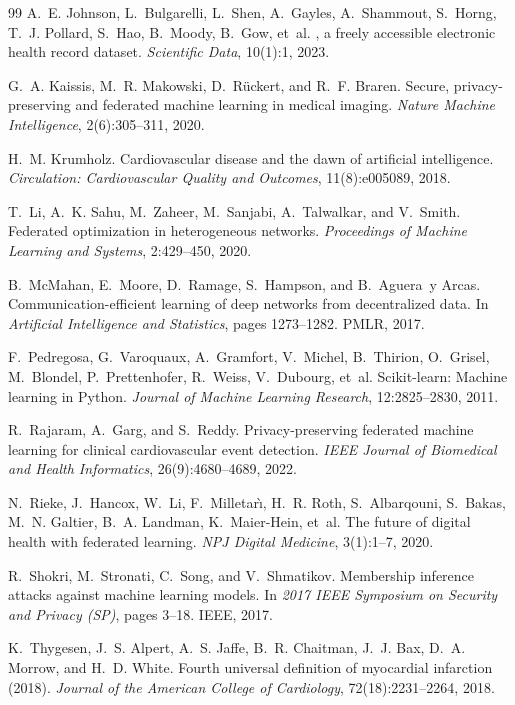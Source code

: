 \documentclass[12pt,a4paper,oneside]{report}
\begin{document}
\begin{thebibliography}{99}
A.~E. Johnson, L.~Bulgarelli, L.~Shen, A.~Gayles, A.~Shammout, S.~Horng, T.~J.
  Pollard, S.~Hao, B.~Moody, B.~Gow, et~al.
, a freely accessible electronic health record dataset.
\newblock \emph{Scientific Data}, 10(1):1, 2023.

G.~A. Kaissis, M.~R. Makowski, D.~R{\"u}ckert, and R.~F. Braren.
\newblock Secure, privacy-preserving and federated machine learning in medical
  imaging.
\newblock \emph{Nature Machine Intelligence}, 2(6):305--311, 2020.

H.~M. Krumholz.
\newblock Cardiovascular disease and the dawn of artificial intelligence.
\newblock \emph{Circulation: Cardiovascular Quality and Outcomes}, 11(8):e005089, 2018.

T.~Li, A.~K. Sahu, M.~Zaheer, M.~Sanjabi, A.~Talwalkar, and V.~Smith.
\newblock Federated optimization in heterogeneous networks.
\newblock \emph{Proceedings of Machine Learning and Systems}, 2:429--450, 2020.

B.~McMahan, E.~Moore, D.~Ramage, S.~Hampson, and B.~Aguera~y Arcas.
\newblock Communication-efficient learning of deep networks from decentralized data.
\newblock In \emph{Artificial Intelligence and Statistics}, pages 1273--1282. PMLR, 2017.

F.~Pedregosa, G.~Varoquaux, A.~Gramfort, V.~Michel, B.~Thirion, O.~Grisel,
  M.~Blondel, P.~Prettenhofer, R.~Weiss, V.~Dubourg, et~al.
\newblock Scikit-learn: Machine learning in {Python}.
\newblock \emph{Journal of Machine Learning Research}, 12:2825--2830, 2011.

R.~Rajaram, A.~Garg, and S.~Reddy.
\newblock Privacy-preserving federated machine learning for clinical cardiovascular event detection.
\newblock \emph{IEEE Journal of Biomedical and Health Informatics}, 26(9):4680--4689, 2022.

N.~Rieke, J.~Hancox, W.~Li, F.~Milletar{\`\i}, H.~R. Roth, S.~Albarqouni,
  S.~Bakas, M.~N. Galtier, B.~A. Landman, K.~Maier-Hein, et~al.
\newblock The future of digital health with federated learning.
\newblock \emph{NPJ Digital Medicine}, 3(1):1--7, 2020.

R.~Shokri, M.~Stronati, C.~Song, and V.~Shmatikov.
\newblock Membership inference attacks against machine learning models.
\newblock In \emph{2017 IEEE Symposium on Security and Privacy (SP)}, pages 3--18. IEEE, 2017.

K.~Thygesen, J.~S. Alpert, A.~S. Jaffe, B.~R. Chaitman, J.~J. Bax, D.~A. Morrow,
  and H.~D. White.
\newblock Fourth universal definition of myocardial infarction (2018).
\newblock \emph{Journal of the American College of Cardiology}, 72(18):2231--2264, 2018.

\end{thebibliography}
\end{document}
